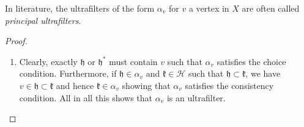 \begin{rem}
  In literature, the ultrafilters of the form \(\alpha_v\) for \(v\) a vertex in \(X\) are often called \emph{principal ultrafilters}.
\end{rem}

\begin{proof}
  \begin{enumerate}
  \item Clearly, exactly \(\mathfrak{h}\) or \(\mathfrak{h}^\ast\) must contain \(v\) such that \(\alpha_v\) satisfies the choice condition. Furthermore, if \(\mathfrak{h} \in \alpha_v\) and \(\mathfrak{k} \in \mathcal{H}\) such that \(\mathfrak{h} \subset \mathfrak{k}\), we have \(v \in \mathfrak{h} \subset \mathfrak{k}\) and hence \(\mathfrak{k} \in \alpha_v\) showing that \(\alpha_v\) satisfies the consistency condition. All in all this shows that \(\alpha_v\) is an ultrafilter.


\end{enumerate}
\end{proof}
